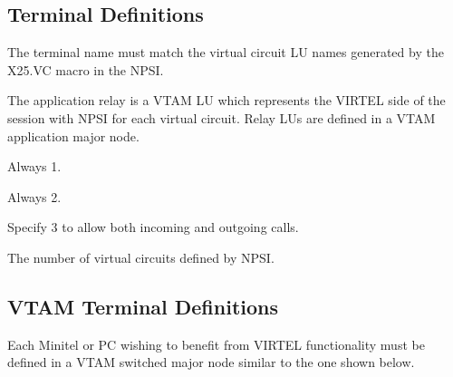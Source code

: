 \documentclass[letterpaper,10pt,english]{sphinxmanual}
\begin{document}
\sphinxAtStartPar
{}

\ignorespaces 

\subsection{Terminal Definitions}
\label{\detokenize{connectivity_guide:index-63}}\label{\detokenize{connectivity_guide:id29}}\begin{description}
\sphinxAtStartPar
The terminal name must match the virtual circuit LU names generated by the X25.VC macro in the NPSI.

\sphinxAtStartPar
The application relay is a VTAM LU which represents the VIRTEL side of the session with NPSI for each virtual circuit. Relay LUs are defined in a VTAM application major node.

\sphinxAtStartPar
Always 1.

\sphinxAtStartPar
Always 2.

\sphinxAtStartPar
Specify 3 to allow both incoming and outgoing calls.

\sphinxAtStartPar
The number of virtual circuits defined by NPSI.

\end{description}

\ignorespaces 

\subsection{VTAM Terminal Definitions}
\label{\detokenize{connectivity_guide:index-64}}\label{\detokenize{connectivity_guide:id30}}
\sphinxAtStartPar
Each Minitel or PC wishing to benefit from VIRTEL functionality must be defined in a VTAM switched major node similar to the one shown below.
\end{document}
